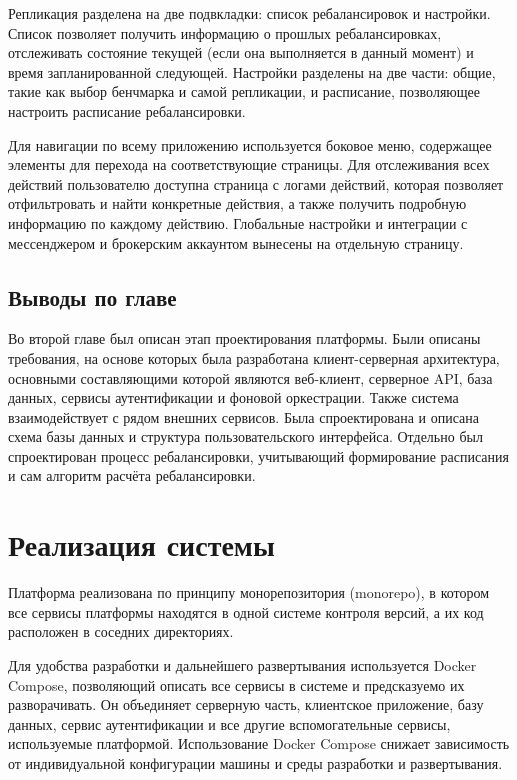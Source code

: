 \documentclass[14pt]{gost-7-32}
\begin{document}
Репликация разделена на две подвкладки: список ребалансировок и настройки. Список позволяет получить информацию о прошлых ребалансировках, отслеживать состояние текущей (если она выполняется в данный момент) и время запланированной следующей. Настройки разделены на две части: общие, такие как выбор бенчмарка и самой репликации, и расписание, позволяющее настроить расписание ребалансировки.

Для навигации по всему приложению используется боковое меню, содержащее элементы для перехода на соответствующие страницы. Для отслеживания всех действий пользователю доступна страница с логами действий, которая позволяет отфильтровать и найти конкретные действия, а также получить подробную информацию по каждому действию. Глобальные настройки и интеграции с мессенджером и брокерским аккаунтом вынесены на отдельную страницу.

\subsection{Выводы по главе}

Во второй главе был описан этап проектирования платформы. Были описаны требования, на основе которых была разработана клиент-серверная архитектура, основными составляющими которой являются веб-клиент, серверное API, база данных, сервисы аутентификации и фоновой оркестрации. Также система взаимодействует с рядом внешних сервисов. Была спроектирована и описана схема базы данных и структура пользовательского интерфейса. Отдельно был спроектирован процесс ребалансировки, учитывающий формирование расписания и сам алгоритм расчёта ребалансировки.

\newpage
\section{Реализация системы}

Платформа реализована по принципу монорепозитория (monorepo), в котором все сервисы платформы находятся в одной системе контроля версий, а их код расположен в соседних директориях.

Для удобства разработки и дальнейшего развертывания используется Docker Compose, позволяющий описать все сервисы в системе и предсказуемо их разворачивать. Он объединяет серверную часть, клиентское приложение, базу данных, сервис аутентификации и все другие вспомогательные сервисы, используемые платформой. Использование Docker Compose снижает зависимость от индивидуальной конфигурации машины и среды разработки и развертывания.
\end{document}
